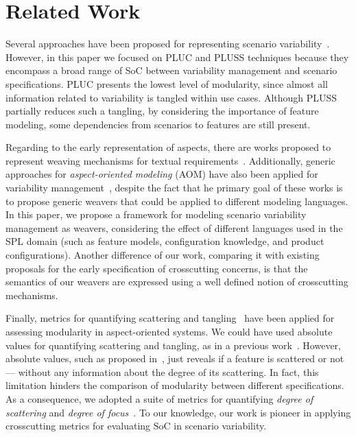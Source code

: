 \documentclass{sig-alternate}
\begin{document}
\section{Related Work}
\label{sec:related}

Several approaches have been proposed for representing
scenario variability~\cite{Jacobson:1997aa,Griss:1998aa, Eriksson:2005aa,Bertolino:2003aa}. However, in this paper
we focused on PLUC and
PLUSS techniques because they encompass a broad range
of SoC between variability management and scenario specifications.
PLUC presents the lowest level of modularity, since
almost all information related to variability is tangled within
use cases. Although PLUSS partially reduces such a tangling,
by considering the importance of feature modeling, some
dependencies from scenarios to features are still present.

Regarding to the early representation of aspects, there are works proposed to
represent weaving mechanisms for textual
requirements~\cite{Chitchyan:2007aa,Sillito:2004aa}.  Additionally, generic 
approaches for \emph{aspect-oriented modeling} (AOM) have also been applied for 
variability management~\cite{Morin:2008aa,Groher:2008aa}, despite the fact that he primary goal of these 
works is to propose generic weavers that could be applied to different modeling languages. In this paper, 
we propose a framework for modeling scenario variability management as weavers, 
considering the effect of different languages used in the SPL domain (such as
feature models, configuration knowledge, and product configurations). 
Another difference of our work, comparing it with existing proposals for the
early specification of crosscutting concerns, is that the semantics of our
weavers are expressed using a well defined notion of crosscutting mechanisms.

Finally, metrics for quantifying scattering and tangling~\cite{Eaddy:2007aa,Figueiredo:2008aa} have been applied for assessing modularity in aspect-oriented
systems. We could have used absolute values for quantifying scattering and tangling, as
 in a previous work~\cite{Bonifacio:2008aa}. However, absolute values, such as proposed in~\cite{Figueiredo:2008aa}, just reveals if a feature is scattered or not--- without any information about the degree of its scattering. In fact, this limitation hinders the comparison of modularity between different specifications.
As a consequence, we adopted a suite of metrics for quantifying
\emph{degree of scattering} and \emph{degree of focus}~\cite{Eaddy:2007aa}.
To our knowledge, our work is pioneer in applying crosscutting metrics for evaluating SoC in scenario variability.
\end{document}
